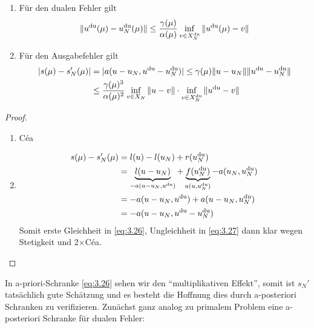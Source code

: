 \begin{satz} \beginwithlist \label{3.60}
	\begin{enumerate}
		\item Für den dualen Fehler gilt
			\[
				\|u^{\mathrm{du}}(\mu)-u_N^{\mathrm{du}}(\mu)\| \leq \frac{\gamma(\mu)}{\alpha(\mu)} \inf_{v \in X_N^{\mathrm{du}}} \|u^{\mathrm{du}}(\mu)-v\|
			\]
		\item Für den Ausgabefehler gilt
			\begin{equation} \label{eq:3.26}
				\begin{aligned}
					|s(\mu)-s_N'(\mu)| &= |a(u-u_N,u^{\mathrm{du}}-u_N^{\mathrm{du}})| \leq \gamma(\mu) \|u-u_N\| \|u^{\mathrm{du}}-u_N^{\mathrm{du}}\|\\
					&\leq \frac{\gamma(\mu)^3}{\alpha(\mu)^2} \inf_{v \in X_N} \|u-v\| \cdot \inf_{v \in X_N^{\mathrm{du}}} \|u^{\mathrm{du}}-v\|
				\end{aligned}
			\end{equation}
	\end{enumerate}

	\begin{proof} \beginwithlistbew
		\begin{enumerate}
			\item Céa
			\item
				\begin{equation} \label{eq:3.27}
					\begin{aligned}
						s(\mu) - s_N'(\mu) &= l(u)-l(u_N)+r(u_N^{\mathrm{du}})\\
						&= \underbrace{l(u-u_N)}_{-a(u-u_N,u^{\mathrm{du}})} + \underbrace{f(u_N^{\mathrm{du}})}_{a(u,u_N^{\mathrm{du}})} - a(u_N,u_N^{\mathrm{du}})\\
						&= -a(u-u_N,u^{\mathrm{du}})+a(u-u_N,u_N^{\mathrm{du}})\\
						&= -a(u-u_N,u^{\mathrm{du}}-u_N^{\mathrm{du}})
					\end{aligned}
				\end{equation}
				Somit erste Gleichheit in \eqref{eq:3.26}, Ungleichheit in \eqref{eq:3.27} dann klar wegen Stetigkeit und 2$\times$Céa.
		\end{enumerate}
	\end{proof}
\end{satz}

In a-priori-Schranke \eqref{eq:3.26} sehen wir den ``multiplikativen Effekt'', somit ist $s_N'$ tatsächlich gute Schätzung und es besteht die Hoffnung dies durch a-posteriori Schranken zu verifizieren.
Zunächst ganz analog zu primalem Problem eine a-posteriori Schranke für dualen Fehler:

